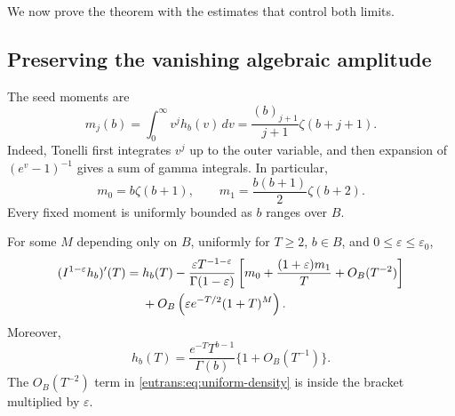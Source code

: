 We now prove the theorem with the estimates that control both limits.

\subsection{Preserving the vanishing algebraic amplitude}

The seed moments are
\begin{equation}\label{eutrans:eq:moments}
 m_j(b)=\int_0^\infty v^j h_b(v)\,dv
       =\frac{(b)_{j+1}}{j+1}\zeta(b+j+1).
\end{equation}
Indeed, Tonelli first integrates $v^j$ up to the outer variable, and
then expansion of $(e^v-1)^{-1}$ gives a sum of gamma integrals. In
particular,
\[
 m_0=b\zeta(b+1),\qquad
 m_1=\frac{b(b+1)}2\zeta(b+2).
\]
Every fixed moment is uniformly bounded as $b$ ranges over $B$.

\begin{lemma}
\label{eutrans:lem:density}
For some $M$ depending only on $B$, uniformly for $T\geq2$,
$b\in B$, and $0\leq\varepsilon\leq\varepsilon_0$,
\begin{align}
 (I^{1-\varepsilon}h_b)'(T)
 ={}&h_b(T)-\frac{\varepsilon T^{-1-\varepsilon}}
                  {\Gamma(1-\varepsilon)}
       \left[m_0+\frac{(1+\varepsilon)m_1}{T}
                    +O_B(T^{-2})\right]\notag\\
 &+O_B\left(\varepsilon e^{-T/2}(1+T)^M\right).
 \label{eutrans:eq:uniform-density}
\end{align}
Moreover,
\begin{equation}\label{eutrans:eq:h-infty}
 h_b(T)=\frac{e^{-T}T^{b-1}}{\Gamma(b)}
                   \{1+O_B(T^{-1})\}.
\end{equation}
The $O_B(T^{-2})$ term in \eqref{eutrans:eq:uniform-density} is
inside the bracket multiplied by $\varepsilon$.
\end{lemma}

